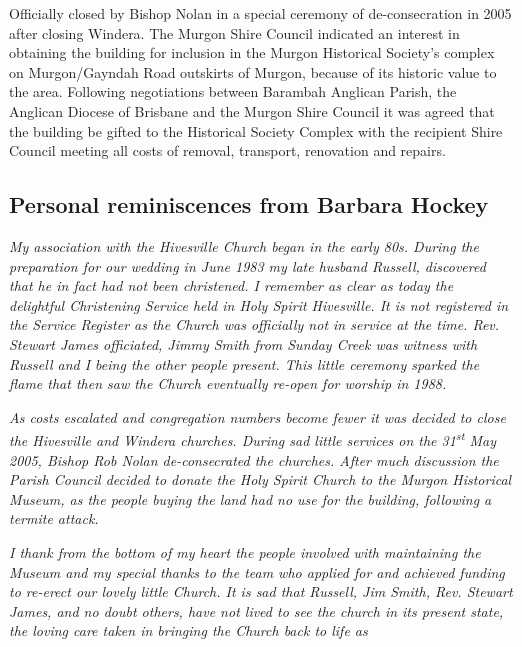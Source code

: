 Officially closed by Bishop Nolan in a special ceremony of de-consecration in 2005 after closing Windera. The Murgon Shire Council indicated an interest in obtaining the building for inclusion in the Murgon Historical Society's complex on Murgon/Gayndah Road outskirts of Murgon, because of its historic value to the area. Following negotiations between Barambah Anglican Parish, the Anglican Diocese of Brisbane and the Murgon Shire Council it was agreed that the building be gifted to the Historical Society Complex with the recipient Shire Council meeting all costs of removal, transport, renovation and repairs.



\subsection{Personal reminiscences from Barbara Hockey}



\emph{My association with the Hivesville Church began in the early 80s. During the preparation for our wedding in June 1983 my late husband Russell, discovered that he in fact had not been christened. I remember as clear as today the delightful Christening Service held in Holy Spirit Hivesville. It is not registered in the Service Register as the Church was officially not in service at the time. Rev. Stewart James officiated, Jimmy Smith from Sunday Creek was witness with Russell and I being the other people present. This little ceremony sparked the flame that then saw the Church eventually re-open for worship in 1988.}



\emph{As costs escalated and congregation numbers become fewer it was decided to close the Hivesville and Windera churches. During sad little services on the 31\textsuperscript{st} May 2005, Bishop Rob Nolan de-consecrated the churches. After much discussion the Parish Council decided to donate the Holy Spirit Church to the Murgon Historical Museum, as the people buying the land had no use for the building, following a termite attack.}



\emph{I thank from the bottom of my heart the people involved with maintaining the Museum and my special thanks to the team who applied for and achieved funding to re-erect our lovely little Church. It is sad that Russell, Jim Smith, Rev. Stewart James, and no doubt others, have not lived to see the church in its present state, the loving care taken in bringing the Church back to life as}



